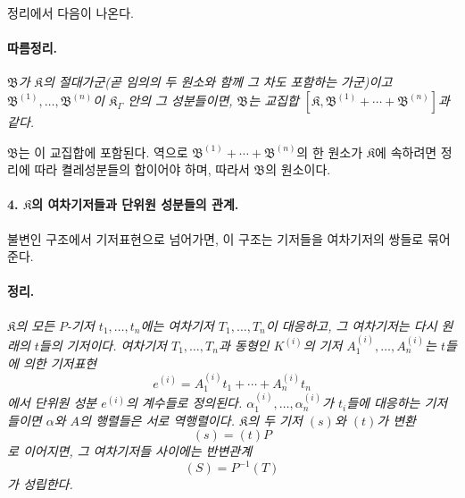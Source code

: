 정리에서 다음이 나온다.

\paragraph{따름정리.}
\emph{\(\mathfrak B\)가 \(\mathfrak K\)의 절대가군(곧 임의의 두 원소와 함께 그 차도 포함하는 가군)이고 \(\mathfrak B^{(1)},\ldots,\mathfrak B^{(n)}\)이 \(\mathfrak K_\Gamma\) 안의 그 성분들이면, \(\mathfrak B\)는 교집합 \([\mathfrak K,\mathfrak B^{(1)}+\cdots+\mathfrak B^{(n)}]\)과 같다.}

\(\mathfrak B\)는 이 교집합에 포함된다. 역으로 \(\mathfrak B^{(1)}+\cdots+\mathfrak B^{(n)}\)의 한 원소가 \(\mathfrak K\)에 속하려면 정리에 따라 켤레성분들의 합이어야 하며, 따라서 \(\mathfrak B\)의 원소이다.

\paragraph{4. \(\mathfrak K\)의 여차기저들과 단위원 성분들의 관계.}
불변인 구조에서 기저표현으로 넘어가면, 이 구조는 기저들을 여차기저의 쌍들로 묶어 준다.

\paragraph{정리.}
\emph{\(\mathfrak K\)의 모든 \(P\)-기저 \(t_1,\ldots,t_n\)에는 여차기저 \(T_1,\ldots,T_n\)이 대응하고, 그 여차기저는 다시 원래의 \(t\)들의 기저이다. 여차기저 \(T_1,\ldots,T_n\)과 동형인 \(K^{(i)}\)의 기저 \(A_1^{(i)},\ldots,A_n^{(i)}\)는 \(t\)들에 의한 기저표현
\[
e^{(i)}=A_1^{(i)}t_1+\cdots+A_n^{(i)}t_n
\]
에서 단위원 성분 \(e^{(i)}\)의 계수들로 정의된다. \(\alpha_1^{(i)},\ldots,\alpha_n^{(i)}\)가 \(t_i\)들에 대응하는 기저들이면 \(\alpha\)와 \(A\)의 행렬들은 서로 역행렬이다. \(\mathfrak K\)의 두 기저 \((s)\)와 \((t)\)가 변환
\[
(s)=(t)P
\]
로 이어지면, 그 여차기저들 사이에는 반변관계
\[
(S)=P^{-1}(T)
\]
가 성립한다.}


